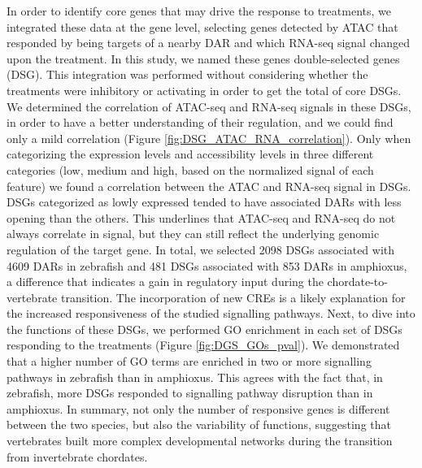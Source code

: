 In order to identify core genes that may drive the response to treatments, we integrated these data at the gene level, selecting genes detected by ATAC that responded by being targets of a nearby DAR and which RNA-seq signal changed upon the treatment. In this study, we named these genes double-selected genes (DSG). This integration was performed without considering whether the treatments were inhibitory or activating in order to get the total of core DSGs. We determined the correlation of ATAC-seq and RNA-seq signals in these DSGs, in order to have a better understanding of their regulation, and we could find only a mild correlation (Figure \ref{fig:DSG_ATAC_RNA_correlation}). Only when categorizing the expression levels and accessibility levels in three different categories (low, medium and high, based on the normalized signal of each feature) we found a correlation between the ATAC and RNA-seq signal in DSGs. DSGs categorized as lowly expressed tended to have associated DARs with less opening than the others.  This underlines that ATAC-seq and RNA-seq do not always correlate in signal, but they can still reflect the underlying genomic regulation of the target gene. 
In total, we selected 2098 DSGs associated with 4609 DARs in zebrafish and 481 DSGs associated with 853 DARs in amphioxus, a difference that indicates a gain in regulatory input during the chordate-to-vertebrate transition. The incorporation of new CREs is a likely explanation for the increased responsiveness of the studied signalling pathways. Next, to dive into the functions of these DSGs, we performed GO enrichment in each set of DSGs responding to the treatments (Figure \ref{fig:DGS_GOs_pval}). We demonstrated that a higher number of GO terms are enriched in two or more signalling pathways in zebrafish than in amphioxus. This agrees with the fact that, in zebrafish, more DSGs responded to signalling pathway disruption than in amphioxus. 
In summary, not only the number of responsive genes is different between the two species, but also the variability of functions, suggesting that vertebrates built more complex developmental networks during the transition from invertebrate chordates.



